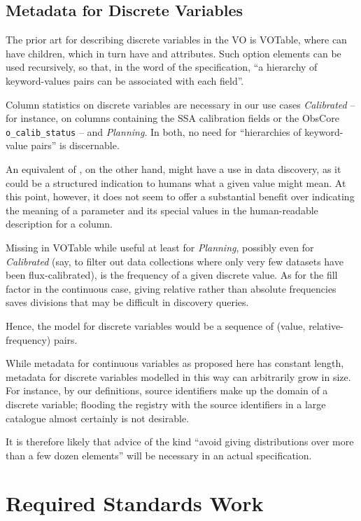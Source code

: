 \documentclass[11pt,a4paper]{ivoa}
\begin{document}
\subsection{Metadata for Discrete Variables}

The prior art for describing discrete variables in the VO is VOTable,
where  can have  children, which in turn
have  and  attributes.  Such option elements
can be used recursively, so that, in the word of the specification, 
``a hierarchy of keyword-values pairs can be associated with each
field''.

Column statistics on discrete variables are necessary in our use cases
\emph{Calibrated} -- for instance, on columns containing the SSA
calibration fields or the ObsCore \verb|o_calib_status| -- and
\emph{Planning}.  In both, no need for ``hierarchies of keyword-value
pairs'' is discernable.

An equivalent of , on the other hand, might have a use in
data discovery, as it could be a structured indication to humans what a
given value might mean.  At this point, however, it does not seem to
offer a substantial benefit over indicating the meaning of a parameter
and its special values in the human-readable description for a column.

Missing in VOTable while useful at least for \emph{Planning}, possibly
even for \emph{Calibrated} (say, to filter out data collections where
only very few datasets have been flux-calibrated), is the frequency of a
given discrete value.  As for the fill factor in the continuous case,
giving relative rather than absolute frequencies saves divisions that may
be difficult in discovery queries.

Hence, the model for discrete variables would be a sequence of (value,
relative-frequency) pairs.

While metadata for continuous variables as proposed here has
constant length, metadata for discrete variables modelled in this way
can arbitrarily grow in
size.  For instance, by our definitions, source identifiers make up the
domain of a discrete variable; flooding the registry with the source
identifiers in a large catalogue almost certainly is not desirable.

It is therefore likely that advice of the kind ``avoid giving
distributions over more than a few dozen elements'' will be necessary in
an actual specification.


\section{Required Standards Work}
\end{document}
